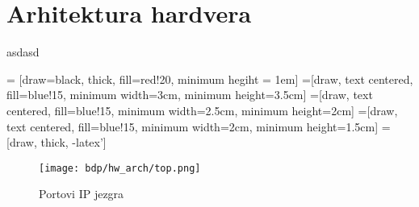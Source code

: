 \section{Arhitektura hardvera}
asdasd

 = [draw=black, thick, fill=red!20, minimum hegiht = 1em]
 =[draw, text centered, fill=blue!15, minimum width=3cm, minimum height=3.5cm]
 =[draw, text centered, fill=blue!15, minimum width=2.5cm, minimum height=2cm]
 =[draw, text centered, fill=blue!15, minimum width=2cm, minimum height=1.5cm]
 = [draw, thick, -latex']

\begin{figure}[h]
  \centering
  \texttt{[image: bdp/hw\_arch/top.png]}
  \caption{Portovi IP jezgra}
  \label{hw_arch_top}
\end{figure}


\begin{figure}[h]
\centering{
  \scalebox{0.8}{
    
  }}
\end{figure}